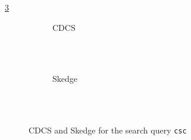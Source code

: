 \ref{fig:sk-index}


\begin{figure}[ht]
    \centering
        \begin{subfigure}[h]{14cm}
            \centering
            \caption{CDCS}
            \label{fig:cdcs-index}
        \end{subfigure}\\
        \vspace{10pt}\\
        \begin{subfigure}[h]{14cm}
            \centering
            \caption{Skedge}
            \label{fig:sk-index}
        \end{subfigure}\\
        \vspace{20pt}\\
    \caption{CDCS and Skedge for the search query {\tt csc}}
\end{figure}

